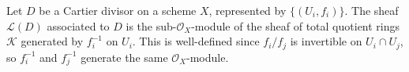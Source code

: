 Let $D$ be a Cartier divisor on a scheme $X$, represented by $\{(U_i, f_i)\}$. The sheaf $\mathcal{L}(D)$ associated to $D$ is the sub-$\mathcal{O}_X$-module of the sheaf of total quotient rings $\mathcal{K}$ generated by $f_i^{-1}$ on $U_i$. This is well-defined since $f_i/f_j$ is invertible on $U_i \cap U_j$, so $f_i^{-1}$ and $f_j^{-1}$ generate the same $\mathcal{O}_X$-module.
